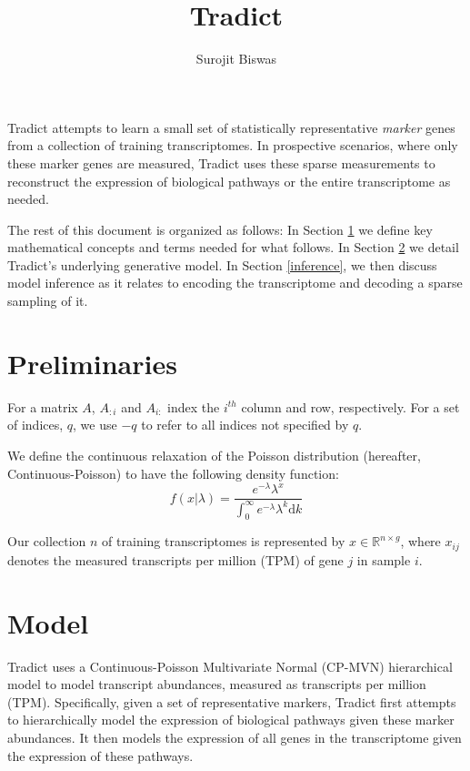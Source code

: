\documentclass[10pt]{article}
\author{Surojit Biswas}
\date{}
\title{Tradict}
\begin{document}
\maketitle

\tableofcontents
\vspace{10mm}


Tradict attempts to learn a small set of statistically representative \emph{marker} genes from a collection of training transcriptomes. In prospective scenarios, where only these marker genes are measured, Tradict uses these sparse measurements to reconstruct the expression of biological pathways or the entire transcriptome as needed.

The rest of this document is organized as follows: In Section \ref{prelim} we define key mathematical concepts and terms needed for what follows. In Section \ref{model} we detail Tradict's underlying generative model. In Section \ref{inference}, we then discuss model inference as it relates to encoding the transcriptome and decoding a sparse sampling of it.

\section{Preliminaries} \label{prelim}

For a matrix $A$, $A_{:i}$ and $A_{i:}$ index the $i^{th}$ column and row, respectively. For a set of indices, $q$, we use $-q$ to refer to all indices not specified by $q$. 

We define the continuous relaxation of the Poisson distribution (hereafter, Continuous-Poisson) to have the following density function:
\[
f(x|\lambda) = \frac{e^{-\lambda} \lambda^x}{\int_0^\infty e^{-\lambda} \lambda^k \textrm{d}k}
\]

Our collection $n$ of training transcriptomes is represented by $x \in \mathbb{R}^{n \times g}$, where $x_{ij}$ denotes the measured transcripts per million (TPM) of gene $j$ in sample $i$. 



\section{Model} \label{model}

Tradict uses a Continuous-Poisson Multivariate Normal (CP-MVN) hierarchical model to model transcript abundances, measured as transcripts per million (TPM). Specifically, given a set of representative markers, Tradict first attempts to hierarchically model the expression of biological pathways given these marker abundances. It then models the expression of all genes in the transcriptome given the expression of these pathways.
\end{document}
